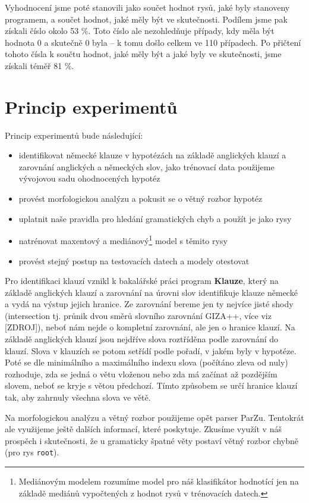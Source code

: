 \documentclass[12pt,a4paper]{report}
\begin{document}
Vyhodnocení jsme poté stanovili jako součet hodnot rysů, jaké byly stanoveny programem, a součet hodnot, jaké měly být ve skutečnosti. Podílem jsme pak získali číslo okolo 53 \%. Toto číslo ale nezohledňuje případy, kdy měla být hodnota 0 a skutečně 0 byla -- k tomu došlo celkem ve 110 případech. Po přičtení tohoto čísla k součtu hodnot, jaké měly být a jaké byly ve skutečnosti, jsme získali téměř 81 \%.


\section{Princip experimentů}

Princip experimentů bude následující:
\begin{itemize}
\item{identifikovat německé klauze v hypotézách na základě anglických klauzí a zarovnání anglických a německých slov, jako trénovací data použijeme vývojovou sadu ohodnocených hypotéz}
\item{provést morfologickou analýzu a pokusit se o větný rozbor hypotéz}
\item{uplatnit naše pravidla pro hledání gramatických chyb a použít je jako rysy}
\item{natrénovat maxentový a mediánový\footnote{Mediánovým modelem rozumíme model pro náš klasifikátor hodnotící jen na základě mediánů vypočtených z hodnot rysů v trénovacích datech.} model s těmito rysy}
\item{provést stejný postup na testovacích datech a modely otestovat}
\end{itemize}

Pro identifikaci klauzí vznikl k bakalářské práci program \textbf{Klauze}, který na základě anglických klauzí a zarovnání na úrovni slov identifikuje klauze německé a vydá na výstup jejich hranice. Ze zarovnání bereme jen ty nejvíce jisté shody (intersection tj. průnik dvou směrů slovního zarovnání GIZA++, více viz [ZDROJ]), neboť nám nejde o kompletní zarovnání, ale jen o hranice klauzí. Na základě anglických klauzí jsou nejdříve slova roztříděna podle zarovnání do klauzí. Slova v klauzích se potom setřídí podle pořadí, v jakém byly v hypotéze. Poté se dle minimálního a maximálního indexu slova (počítáno zleva od nuly) rozhoduje, zda se jedná o větu vloženou nebo zda má začínat až pozdějším slovem, neboť se kryje s větou předchozí. Tímto způsobem se určí hranice klauzí tak, aby zahrnuly všechna slova ve větě.

Na morfologickou analýzu a větný rozbor použijeme opět parser ParZu. Tentokrát ale využijeme ještě dalších informací, které poskytuje. Zkusíme využít v náš prospěch i skutečnosti, že u gramaticky špatné věty postaví větný rozbor chybně (pro rys \texttt{root}).
\end{document}
